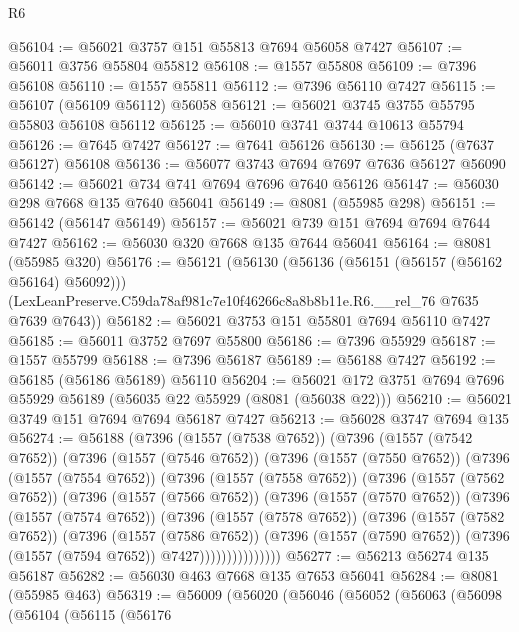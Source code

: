 \begin{lexlean}{R6}
\begin{coremodule}
@56104 := @56021 @3757 @151 @55813 @7694 @56058 @7427
@56107 := @56011 @3756 @55804 @55812
@56108 := @1557 @55808
@56109 := @7396 @56108
@56110 := @1557 @55811
@56112 := @7396 @56110 @7427
@56115 := @56107 (@56109 @56112) @56058
@56121 := @56021 @3745 @3755 @55795 @55803 @56108 @56112
@56125 := @56010 @3741 @3744 @10613 @55794
@56126 := @7645 @7427
@56127 := @7641 @56126
@56130 := @56125 (@7637 @56127) @56108
@56136 := @56077 @3743 @7694 @7697 @7636 @56127 @56090
@56142 := @56021 @734 @741 @7694 @7696 @7640 @56126
@56147 := @56030 @298 @7668 @135 @7640 @56041
@56149 := @8081 (@55985 @298)
@56151 := @56142 (@56147 @56149)
@56157 := @56021 @739 @151 @7694 @7694 @7644 @7427
@56162 := @56030 @320 @7668 @135 @7644 @56041
@56164 := @8081 (@55985 @320)
@56176 := @56121
    (@56130
      (@56136 (@56151 (@56157 (@56162 @56164) @56092)))
      (LexLeanPreserve.C59da78af981c7e10f46266c8a8b8b11e.R6.__rel_76 @7635 @7639 @7643))
@56182 := @56021 @3753 @151 @55801 @7694 @56110 @7427
@56185 := @56011 @3752 @7697 @55800
@56186 := @7396 @55929
@56187 := @1557 @55799
@56188 := @7396 @56187
@56189 := @56188 @7427
@56192 := @56185 (@56186 @56189) @56110
@56204 := @56021 @172 @3751 @7694 @7696 @55929 @56189 (@56035 @22 @55929 (@8081 (@56038 @22)))
@56210 := @56021 @3749 @151 @7694 @7694 @56187 @7427
@56213 := @56028 @3747 @7694 @135
@56274 := @56188
    (@7396
      (@1557 (@7538 @7652))
      (@7396
        (@1557 (@7542 @7652))
        (@7396
          (@1557 (@7546 @7652))
          (@7396
            (@1557 (@7550 @7652))
            (@7396
              (@1557 (@7554 @7652))
              (@7396
                (@1557 (@7558 @7652))
                (@7396
                  (@1557 (@7562 @7652))
                  (@7396
                    (@1557 (@7566 @7652))
                    (@7396
                      (@1557 (@7570 @7652))
                      (@7396
                        (@1557 (@7574 @7652))
                        (@7396
                          (@1557 (@7578 @7652))
                          (@7396
                            (@1557 (@7582 @7652))
                            (@7396
                              (@1557 (@7586 @7652))
                              (@7396
                                (@1557 (@7590 @7652))
                                (@7396 (@1557 (@7594 @7652)) @7427)))))))))))))))
@56277 := @56213 @56274 @135 @56187
@56282 := @56030 @463 @7668 @135 @7653 @56041
@56284 := @8081 (@55985 @463)
@56319 := @56009
    (@56020
      (@56046
        (@56052
          (@56063
            (@56098
              (@56104
                (@56115
                  (@56176

\end{coremodule}
\end{lexlean}
